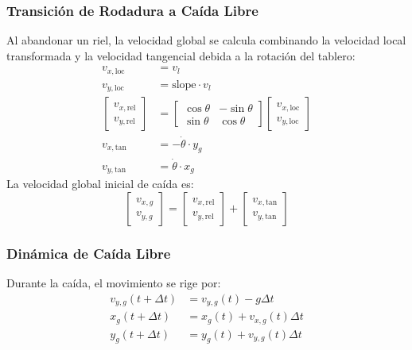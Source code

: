 \documentclass[
A4paper,            1 paper size A4
oneside,            %
openright,          %
10pt,               %
headings=normal,    %
titlepage=on        %
]{article}
\begin{document}
\subsubsection{Transición de Rodadura a Caída Libre}
Al abandonar un riel, la velocidad global se calcula combinando la velocidad local transformada y la velocidad tangencial debida a la rotación del tablero:
\begin{align}
    v_{x,\text{loc}} &= v_l \\
    v_{y,\text{loc}} &= \text{slope} \cdot v_l \\
    \begin{bmatrix} v_{x,\text{rel}} \\ v_{y,\text{rel}} \end{bmatrix} &= \begin{bmatrix} \cos\theta & -\sin\theta \\ \sin\theta & \cos\theta \end{bmatrix} \begin{bmatrix} v_{x,\text{loc}} \\ v_{y,\text{loc}} \end{bmatrix} \\
    v_{x,\text{tan}} &= -\dot{\theta} \cdot y_g \\
    v_{y,\text{tan}} &= \dot{\theta} \cdot x_g
\end{align}
La velocidad global inicial de caída es:
\begin{equation}
    \begin{bmatrix} v_{x,g} \\ v_{y,g} \end{bmatrix} = \begin{bmatrix} v_{x,\text{rel}} \\ v_{y,\text{rel}} \end{bmatrix} + \begin{bmatrix} v_{x,\text{tan}} \\ v_{y,\text{tan}} \end{bmatrix}
\end{equation}

\subsubsection{Dinámica de Caída Libre}
Durante la caída, el movimiento se rige por:
\begin{align}
    v_{y,g}(t+\Delta t) &= v_{y,g}(t) - g \Delta t \\
    x_g(t+\Delta t) &= x_g(t) + v_{x,g}(t) \Delta t \\
    y_g(t+\Delta t) &= y_g(t) + v_{y,g}(t) \Delta t
\end{align}
\end{document}
